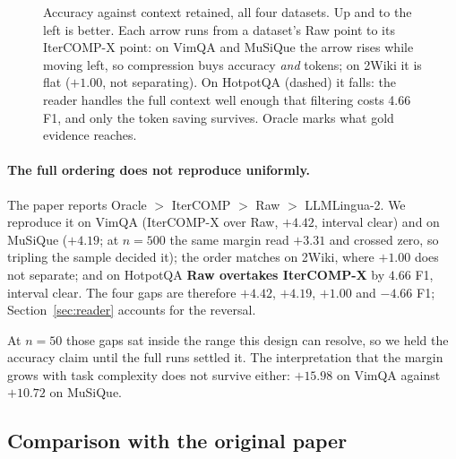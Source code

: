 \documentclass{llncs}
\begin{document}
\begin{figure}[!htbp]
\caption{Accuracy against context retained, all four datasets. Up and to the
left is better. Each arrow runs from a dataset's Raw point to its IterCOMP-X
point: on VimQA and MuSiQue the arrow rises while moving left, so compression
buys accuracy \emph{and} tokens; on 2Wiki it is flat ($+1.00$, not separating).
On HotpotQA (dashed) it falls:
the reader handles the full context well enough that filtering costs 4.66 F1,
and only the token saving survives. Oracle marks what gold evidence reaches.}
\label{fig:tradeoff}
\end{figure}

\paragraph{The full ordering does not reproduce uniformly.} The paper reports
Oracle $>$ IterCOMP $>$ Raw $>$ LLMLingua-2. We reproduce it on VimQA (IterCOMP-X
over Raw, $+4.42$, interval clear) and on MuSiQue ($+4.19$; at $n=500$ the same
margin read $+3.31$ and crossed zero, so tripling the sample decided it); the
order matches on 2Wiki, where $+1.00$ does not separate; and on HotpotQA
\textbf{Raw overtakes IterCOMP-X} by $4.66$ F1, interval clear. The four gaps are
therefore $+4.42$, $+4.19$, $+1.00$ and $-4.66$ F1; Section~\ref{sec:reader}
accounts for the reversal.

At $n=50$ those gaps sat inside the range this design can resolve, so we held the
accuracy claim until the full runs settled it. The interpretation that the margin
grows with task complexity does not survive either: $+15.98$ on VimQA against
$+10.72$ on MuSiQue.

\subsection{Comparison with the original paper}
\label{sec:vspaper}
\end{document}
